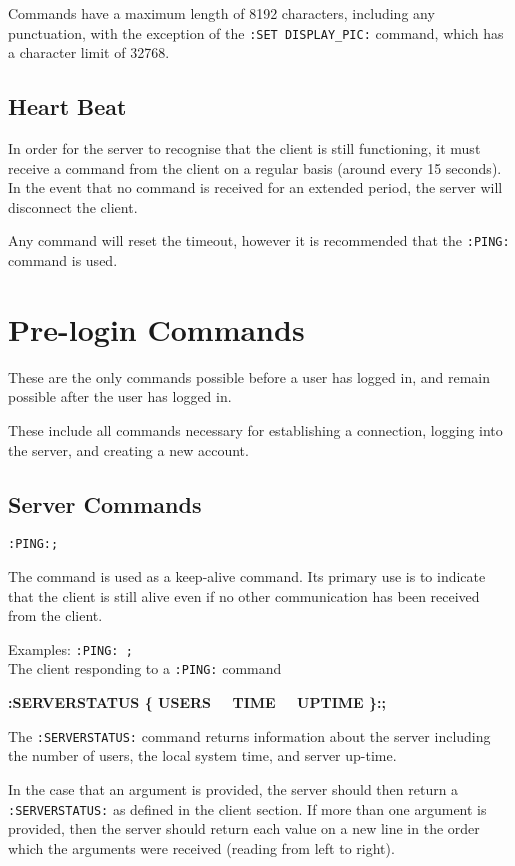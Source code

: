 Commands have a maximum length of 8192 characters, including any punctuation, with the exception of the \texttt{:SET DISPLAY\_PIC:} command, which has a character limit of 32768.

\subsection{Heart Beat}

In order for the server to recognise that the client is still functioning, it must receive a command from the client on a regular basis (around every 15 seconds). In the event that no command is received for an extended period, the server will disconnect the client.

Any command will reset the timeout, however it is recommended that the \texttt{:PING:} command is used.

\section{Pre-login Commands}

These are the only commands possible before a user has logged in, and remain possible after the user has logged in.

These include all commands necessary for establishing a connection, logging into the server, and creating a new account.

\subsection{Server Commands}
\label{servercomm}

\texttt{:PING:;}

The command is used as a keep-alive command. Its primary use is to indicate that the client is still alive even if no other communication has been received from the client. 

Examples:
\texttt{:PING: ;} \\
The client responding to a \texttt{:PING:} command

{\bf :SERVERSTATUS \{ USERS \ \vline \ TIME \ \vline \ UPTIME \}:;}

The \texttt{:SERVERSTATUS:} command returns information about the server including the number of users, the local system time, and server up-time.
 
In the case that an argument is provided, the server should then return a \texttt{:SERVERSTATUS:} as defined in the client section. If more than one argument is provided, then the server should return each value on a new line in the order which the arguments were received (reading from left to right).

